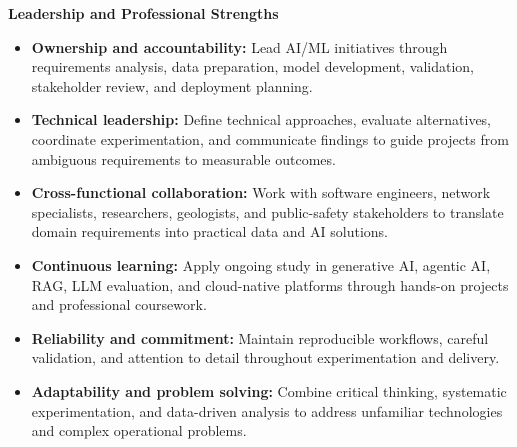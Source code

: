 \documentclass[9pt,letterpaper]{extarticle}
\begin{document}
\par
{}\par
{}\par
{}\textbf{Leadership and Professional Strengths}\par
\begin{itemize}
\item \textbf{Ownership and accountability:} Lead AI/ML initiatives through requirements analysis, data preparation, model development, validation, stakeholder review, and deployment planning.
\item \textbf{Technical leadership:} Define technical approaches, evaluate alternatives, coordinate experimentation, and communicate findings to guide projects from ambiguous requirements to measurable outcomes.
\item \textbf{Cross-functional collaboration:} Work with software engineers, network specialists, researchers, geologists, and public-safety stakeholders to translate domain requirements into practical data and AI solutions.
\item \textbf{Continuous learning:} Apply ongoing study in generative AI, agentic AI, RAG, LLM evaluation, and cloud-native platforms through hands-on projects and professional coursework.
\item \textbf{Reliability and commitment:} Maintain reproducible workflows, careful validation, and attention to detail throughout experimentation and delivery.
\item \textbf{Adaptability and problem solving:} Combine critical thinking, systematic experimentation, and data-driven analysis to address unfamiliar technologies and complex operational problems.
\end{itemize}
\end{document}
